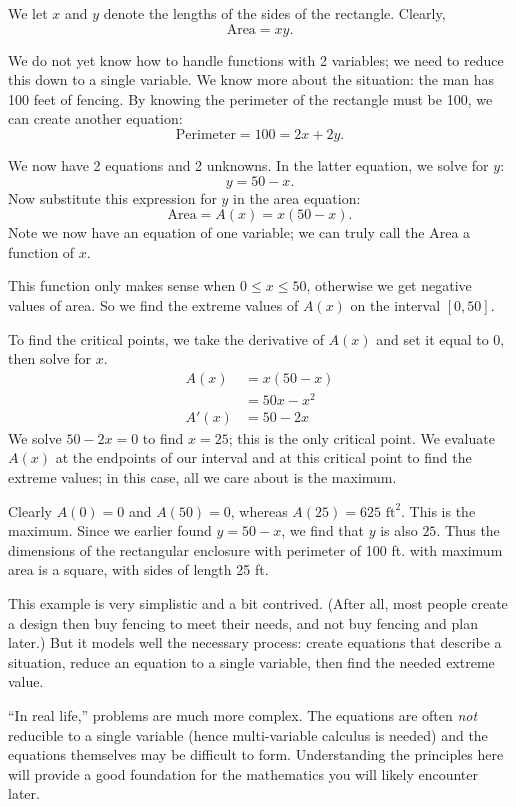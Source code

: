 \begin{example}
We let $x$ and $y$ denote the lengths of the sides of the rectangle. Clearly, \[\text{Area}=xy.\]

We do not yet know how to handle functions with 2 variables; we need to reduce this down to a single variable. We know more about the situation: the man has 100 feet of fencing. By knowing the perimeter of the rectangle must be 100, we can create another equation:
\[\text{Perimeter} = 100 = 2x+2y.\]

We now have 2 equations and 2 unknowns. In the latter equation, we solve for $y$:
\[y = 50-x.\]
Now substitute this expression for $y$ in the area equation:
\[\text{Area} = A(x) = x(50-x).\]
Note we now have an equation of one variable; we can truly call the Area a function of $x$. 

This function only makes sense when $0\leq x \leq 50$, otherwise we get negative values of area. So we find the extreme values of $A(x)$ on the interval $[0,50]$. 

To find the critical points, we take the derivative of $A(x)$ and set it equal to 0, then solve for $x$.
\begin{align*}
A(x) &= x(50-x) \\
			&= 50x-x^2 \\
A'(x) 	&= 50-2x
\end{align*}
We solve $50-2x=0$ to find $x=25$; this is the only critical point. We evaluate $A(x)$ at the endpoints of our interval and at this critical point to find the extreme values; in this case, all we care about is the maximum.

Clearly $A(0)=0$ and $A(50)=0$, whereas $A(25) = 625 \text{ ft}^2$. This is the maximum. Since we earlier found $y = 50-x$, we find that $y$ is also $25$. Thus the dimensions of the rectangular enclosure with perimeter of 100 ft. with maximum area is a square, with sides of length 25 ft.
\end{example}

This example is very simplistic and a bit contrived. (After all, most people create a design then buy fencing to meet their needs, and not buy fencing and plan later.) But it models well the necessary process: create equations that describe a situation, reduce an equation to a single variable, then find the needed extreme value.

``In real life,'' problems are much more complex. The equations are often \emph{not} reducible to a single variable (hence multi-variable calculus is needed) and the equations themselves may be difficult to form. Understanding the principles here will provide a good foundation for the mathematics you will likely encounter later.

